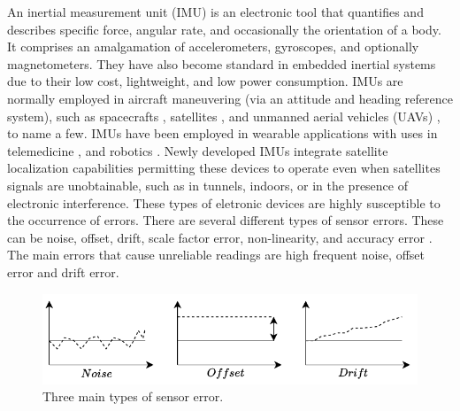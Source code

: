 An inertial measurement unit (IMU) is an electronic tool that quantifies and describes specific force, angular rate, and occasionally the orientation of a body. It comprises an amalgamation of accelerometers, gyroscopes, and optionally magnetometers. They have also become standard in embedded inertial systems due to their low cost, lightweight, and low power consumption. IMUs are normally employed in aircraft maneuvering (via an attitude and heading reference system), such as spacecrafts \cite{li2011calibration} \cite{haberberger2016imu} \cite{faragher2012understanding}, satellites \cite{lu2020orbit}, and unmanned aerial vehicles (UAVs) \cite{sahawneh2008development} \cite{eling2015real}, to name a few. IMUs have been employed in wearable applications with uses in  telemedicine \cite{madgwick2020extended} \cite{allen2013telemedicine} \cite{giansanti2009toward} \cite{o2021measuring}, and robotics \cite{wilson2019formulation}. Newly developed IMUs integrate satellite localization capabilities permitting these devices to operate even when satellites signals are unobtainable, such as in tunnels, indoors, or in the presence of electronic interference. These types of eletronic devices are highly susceptible to the occurrence of errors. There are several different types of sensor errors. These can be noise, offset, drift, scale factor error, non-linearity, and accuracy error \cite{hanke2016classification}. The main errors that cause unreliable readings are high frequent noise, offset error and drift error.

\begin{figure}[!h]
    \centering
    \includegraphics[width=1\textwidth]{figures/noise.pdf}
    \caption{Three main types of sensor error.}
    \label{fig:noise}
\end{figure}

